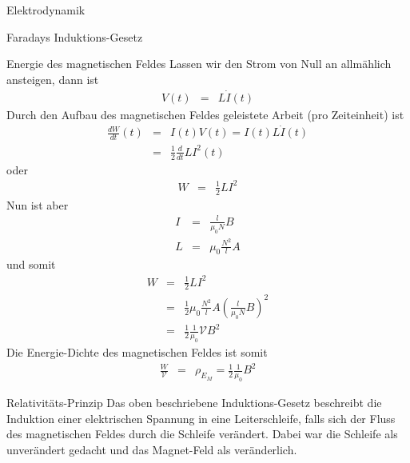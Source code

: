 \begin{chapter}{\titlestr}
\begin{section}{Elektrodynamik}
\begin{subsection}{Faradays Induktions-Gesetz}
\begin{subsubsection}{Energie des magnetischen Feldes}
Lassen wir den Strom von Null an allmählich ansteigen, dann ist
\begin{eqnarray*}
V(t) &=& L\dot{I}(t)
\end{eqnarray*}
Durch den Aufbau des magnetischen Feldes geleistete Arbeit (pro Zeiteinheit) ist
\begin{eqnarray*}
\frac{dW}{dt}(t) &=& I(t)V(t) = I(t)L\dot{I}(t)\\
&=& \frac{1}{2}\frac{d}{dt}LI^2(t)
\end{eqnarray*}
oder
\begin{eqnarray*}
W&=& \frac{1}{2}LI^2
\end{eqnarray*}
Nun ist aber
\begin{eqnarray*}
I &=& \frac{l}{\mu_0N}B\\
L&=&\mu_0\frac{N^2}{l}A
\end{eqnarray*}
und somit
\begin{eqnarray*}
W&=& \frac{1}{2}LI^2\\
&=& \frac{1}{2}\mu_0\frac{N^2}{l}A\left(\frac{l}{\mu_0N}B\right)^2\\
&=& \frac{1}{2}\frac{1}{\mu_0}\mathcal{V}B^2
\end{eqnarray*}
Die Energie-Dichte des magnetischen Feldes ist somit
\begin{eqnarray}
\label{M_energyDensity}
\frac{W}{\mathcal{V}}&=& \rho_{E_M}=\frac{1}{2}\frac{1}{\mu_0}B^2
\end{eqnarray}
\end{subsubsection}

\begin{subsubsection}{Relativitäts-Prinzip}
Das oben beschriebene Induktions-Gesetz beschreibt die Induktion einer elektrischen Spannung in eine Leiterschleife, falls sich der Fluss des magnetischen Feldes durch die Schleife verändert.
Dabei war die Schleife als unverändert gedacht und das Magnet-Feld als veränderlich.


\end{subsubsection}
\end{subsection}
\end{section}
\end{chapter}
